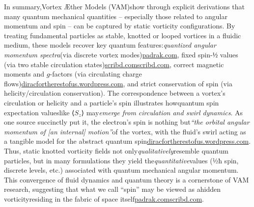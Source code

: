 In summary,Vortex Æther Models (VAM)show through explicit derivations that many quantum mechanical quantities – especially those related to angular momentum and spin – can be captured by static vorticity configurations. By treating fundamental particles as stable, knotted or looped vortices in a fluidic medium, these models recover key quantum features:\textit{quantized angular momentum spectra}(via discrete vortex modes)\href{https://www.padrak.com/ine/RS_REF9.html#:~:text=Matter,out%20energy%20and%20ether%2Fspace%20at}{padrak.com}, fixed spin-$½$ values (via two stable circulation states)\href{https://www.scribd.com/document/310197123/Ether-and-Mater-by-Carl-Krafft-pdf#:~:text=structure%2C%20the%20nuclear%20theory%20assumes,that%20the%20electrons%20can}{scribd.com}\href{https://www.scribd.com/document/310197123/Ether-and-Mater-by-Carl-Krafft-pdf#:~:text=There%20are%20no%20such%20inherent,difficulties%20in%20accounting%20for}{scribd.com}, correct magnetic moments and $g$-factors (via circulating charge flows)\href{https://diracfortherestofus.wordpress.com/2018/06/05/12-zitterwebegung/#:~:text=direction%20of%20the%20electron%20spin,intrinsic%20magnetic%20moment%20of%20the}{diracfortherestofus.wordpress.com}, and strict conservation of spin (via helicity/circulation conservation). The correspondence between a vortex’s circulation or helicity and a particle’s spin illustrates howquantum spin expectation valueslike ⟨$S_z$⟩ may\textit{emerge from circulation and swirl dynamics}. As one source succinctly put it, the electron’s spin is nothing but\textit{“the orbital angular momentum of [an internal] motion”}of the vortex, with the fluid’s swirl acting as a tangible model for the abstract quantum spin\href{https://diracfortherestofus.wordpress.com/2018/06/05/12-zitterwebegung/#:~:text=direction%20of%20the%20electron%20spin,intrinsic%20magnetic%20moment%20of%20the}{diracfortherestofus.wordpress.com}. Thus, static knotted vorticity fields not only\textit{qualitatively}resemble quantum particles, but in many formulations they yield the\textit{quantitative}values (½ħ spin, discrete levels, etc.) associated with quantum mechanical angular momentum. This convergence of fluid dynamics and quantum theory is a cornerstone of VAM research, suggesting that what we call “spin” may be viewed as ahidden vorticityresiding in the fabric of space itself\href{https://www.padrak.com/ine/RS_REF9.html#:~:text=Matter,out%20energy%20and%20ether%2Fspace%20at}{padrak.com}\href{https://www.scribd.com/document/310197123/Ether-and-Mater-by-Carl-Krafft-pdf#:~:text=There%20are%20no%20such%20inherent,difficulties%20in%20accounting%20for}{scribd.com}.

